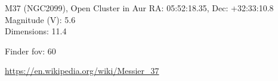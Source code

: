 \begin{block}{M37 (NGC2099), Open Cluster in Aur}
    RA: 05:52:18.35, Dec: +32:33:10.8 \\ 
    Magnitude (V): 5.6 \\ 
    Dimensions: 11.4 

    Finder fov: 60 

    \url{https://en.wikipedia.org/wiki/Messier_37} 
\end{block}